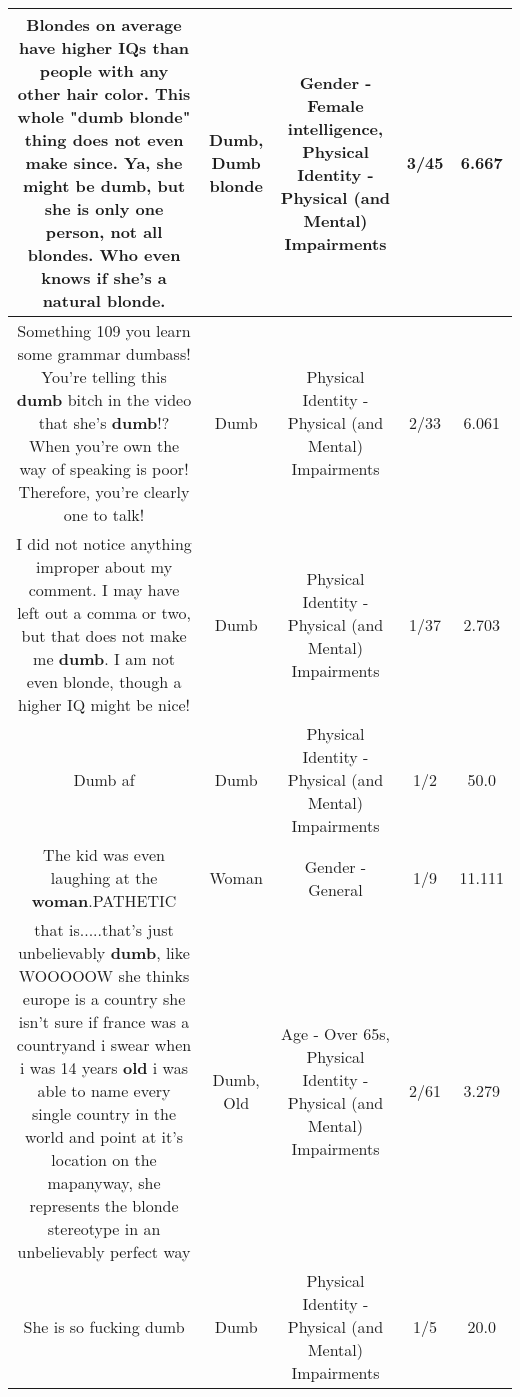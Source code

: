 \documentclass[11pt]{article}
\newlength\mylength
\begin{document}
\begin{center}
\begin{longtable}{|C{.65\mylength}|C{.30\mylength}|C{.12\mylength}|C{.12\mylength}|C{.12\mylength}|}
  \small Blondes on average have higher IQs than people with any other hair color. This whole "\textbf{d\textbf{umb} blonde}" thing does not even make since. Ya, she might be \textbf{dumb}, but she is only one person, not all blondes. Who even knows if she's a natural blonde.\normalsize   & Dumb, Dumb blonde & Gender - Female intelligence, Physical Identity - Physical (and Mental) Impairments & 3/45 & 6.667 \\  \hline
  \small Something 109 you learn some grammar dumbass! You're telling this \textbf{dumb} bitch in the video that she's \textbf{dumb}!? When you're own the way of speaking is poor! Therefore, you're clearly one to talk!\normalsize   & Dumb & Physical Identity - Physical (and Mental) Impairments & 2/33 & 6.061 \\  \hline
  \small I did not notice anything improper about my comment. I may have left out a comma or two, but that does not make me \textbf{dumb}. I am not even blonde, though a higher IQ might be nice!\normalsize   & Dumb & Physical Identity - Physical (and Mental) Impairments & 1/37 & 2.703 \\  \hline
  \small Dumb af\normalsize   & Dumb & Physical Identity - Physical (and Mental) Impairments & 1/2 & 50.0 \\  \hline
  \small The kid was even laughing at the \textbf{woman}.PATHETIC\normalsize   & Woman & Gender - General & 1/9 & 11.111 \\  \hline
  \small that is.....that's just unbelievably \textbf{dumb}, like WOOOOOW she thinks europe is a country she isn't sure if france was a countryand i swear when i was 14 years \textbf{old} i was able to name every single country in the world and point at it's location on the mapanyway, she represents the blonde stereotype in an unbelievably perfect way\normalsize   & Dumb, Old & Age - Over 65s, Physical Identity - Physical (and Mental) Impairments & 2/61 & 3.279 \\  \hline
  \small She is so fucking dumb\normalsize   & Dumb & Physical Identity - Physical (and Mental) Impairments & 1/5 & 20.0 \\  \hline

\end{longtable}
\end{center}
\end{document}
